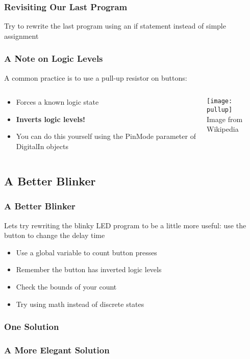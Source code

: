 \begin{frame}[fragile]
	\frametitle{Revisiting Our Last Program}
	Try to rewrite the last program using an if statement instead of simple assignment
	\pause
	
\end{frame}

\begin{frame}
	\frametitle{A Note on Logic Levels}
	A common practice is to use a pull-up resistor on buttons:
	\begin{columns}[c]
		\begin{column}{0.5\textwidth}
			\begin{itemize}
				\item Forces a known logic state
				\item \textbf{Inverts logic levels!}
				\item You can do this yourself using the PinMode parameter of DigitalIn objects
			\end{itemize}
		\end{column}
		\begin{column}{0.5\textwidth}
			\begin{center}
				\texttt{[image: pullup]}\\
				\tiny Image from Wikipedia
			\end{center}
		\end{column}
	\end{columns}
\end{frame}

\subsection{A Better Blinker}
\label{sub:better_blink}
\begin{frame}
	\frametitle{A Better Blinker}
	Lets try rewriting the blinky LED program to be a little more useful: use the button to change the delay time
	\pause
	\begin{itemize}
		\item Use a global variable to count button presses
		\item Remember the button has inverted logic levels
		\item Check the bounds of your count
		\item Try using math instead of discrete states
	\end{itemize}
\end{frame}

\begin{frame}[fragile]
	\frametitle{One Solution}
	
\end{frame}

\begin{frame}[fragile]
	\frametitle{A More Elegant Solution}
	
\end{frame}
